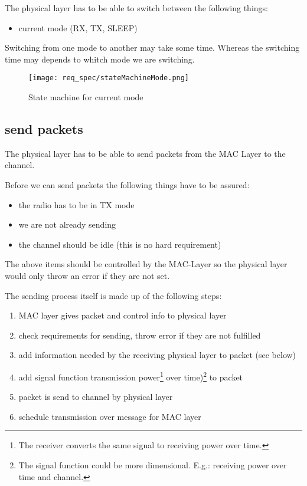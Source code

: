 The physical layer has to be able to switch between the following things:

\begin{itemize}
 \item current mode (RX, TX, SLEEP)
\end{itemize}

Switching from one mode to another may take some time. Whereas the switching time may depends to whitch mode we are switching.

\begin{figure}[t]
 \centering
 \texttt{[image: req\_spec/stateMachineMode.png]}
 \caption{State machine for current mode}
 \label{fig: mode state machine}
\end{figure}

\pagebreak
\subsection{send packets}

The physical layer has to be able to send packets from the MAC 
Layer to the channel.

Before we can send packets the following things have to be 
assured:
\linebreak
\begin{itemize}
 \item the radio has to be in TX mode
 \item we are not already sending
 \item the channel should be idle (this is no hard requirement)
\end{itemize}

The above items should be controlled by the MAC-Layer so the physical layer 
would only throw an error if they are not set.

The sending process itself is made up of the following steps:

\begin{enumerate}
 \item MAC layer gives packet and control info to physical layer
 \item check requirements for sending, throw error if they are not fulfilled
 \item add information needed by the receiving physical layer to packet (see below)
 \item add signal function transmission power\footnote{The receiver converts the same signal to receiving power over time.} over time)\footnote{The signal function could be more dimensional. E.g.: receiving power over time and channel.} to packet
 \item packet is send to channel by physical layer
 \item schedule transmission over message for MAC layer
\end{enumerate}

